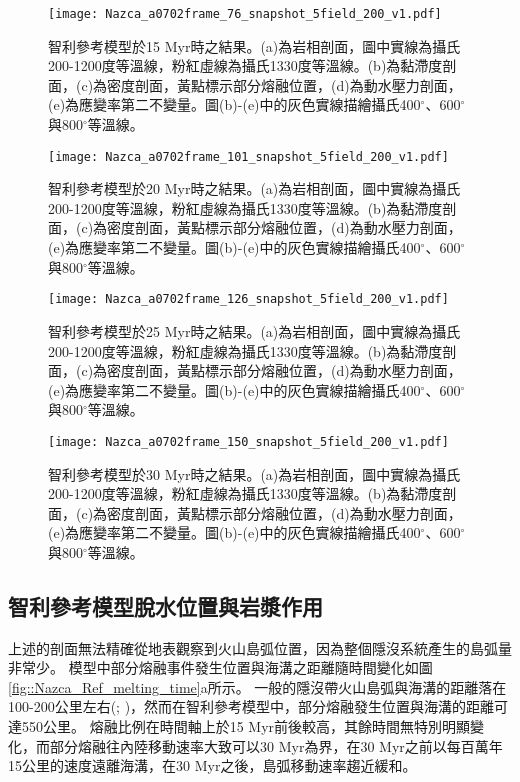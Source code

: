 \begin{figure*}[htp]
    \centering
    \texttt{[image: Nazca\_a0702frame\_76\_snapshot\_5field\_200\_v1.pdf]}
    \caption[智利參考模型於15 Myr時之結果]{智利參考模型於15 Myr時之結果。(a)為岩相剖面，圖中實線為攝氏200-1200度等溫線，粉紅虛線為攝氏1330度等溫線。(b)為黏滯度剖面，(c)為密度剖面，黃點標示部分熔融位置，(d)為動水壓力剖面，(e)為應變率第二不變量。圖(b)-(e)中的灰色實線描繪攝氏400$^{\circ}$、600$^{\circ}$與800$^{\circ}$等溫線。}
    \label{fig::Nazca_Ref_76}
\end{figure*}

\begin{figure*}[htp]
    \centering
    \texttt{[image: Nazca\_a0702frame\_101\_snapshot\_5field\_200\_v1.pdf]}
    \caption[智利參考模型於20 Myr時之結果]{智利參考模型於20 Myr時之結果。(a)為岩相剖面，圖中實線為攝氏200-1200度等溫線，粉紅虛線為攝氏1330度等溫線。(b)為黏滯度剖面，(c)為密度剖面，黃點標示部分熔融位置，(d)為動水壓力剖面，(e)為應變率第二不變量。圖(b)-(e)中的灰色實線描繪攝氏400$^{\circ}$、600$^{\circ}$與800$^{\circ}$等溫線。}
    \label{fig::Nazca_Ref_101}
\end{figure*}

\begin{figure*}[htp]
    \centering
    \texttt{[image: Nazca\_a0702frame\_126\_snapshot\_5field\_200\_v1.pdf]}
    \caption[智利參考模型於25 Myr時之結果]{智利參考模型於25 Myr時之結果。(a)為岩相剖面，圖中實線為攝氏200-1200度等溫線，粉紅虛線為攝氏1330度等溫線。(b)為黏滯度剖面，(c)為密度剖面，黃點標示部分熔融位置，(d)為動水壓力剖面，(e)為應變率第二不變量。圖(b)-(e)中的灰色實線描繪攝氏400$^{\circ}$、600$^{\circ}$與800$^{\circ}$等溫線。}
    \label{fig::Nazca_Ref_126}
\end{figure*}


\begin{figure*}[htp]
    \centering
    \texttt{[image: Nazca\_a0702frame\_150\_snapshot\_5field\_200\_v1.pdf]}
    \caption[智利參考模型於30 Myr時之結果]{智利參考模型於30 Myr時之結果。(a)為岩相剖面，圖中實線為攝氏200-1200度等溫線，粉紅虛線為攝氏1330度等溫線。(b)為黏滯度剖面，(c)為密度剖面，黃點標示部分熔融位置，(d)為動水壓力剖面，(e)為應變率第二不變量。圖(b)-(e)中的灰色實線描繪攝氏400$^{\circ}$、600$^{\circ}$與800$^{\circ}$等溫線。}
    \label{fig::Nazca_Ref_150}
\end{figure*}
\newpage
\subsection{智利參考模型脫水位置與岩漿作用}
上述的剖面無法精確從地表觀察到火山島弧位置，因為整個隱沒系統產生的島弧量非常少。
模型中部分熔融事件發生位置與海溝之距離隨時間變化如圖\ref{fig::Nazca_Ref_melting_time}a所示。
一般的隱沒帶火山島弧與海溝的距離落在100-200公里左右(\citealp{peacock1990fluid}; \citealp{hyndman2003serpentinization})，然而在智利參考模型中，部分熔融發生位置與海溝的距離可達550公里。
熔融比例在時間軸上於15 Myr前後較高，其餘時間無特別明顯變化，而部分熔融往內陸移動速率大致可以30 Myr為界，在30 Myr之前以每百萬年15公里的速度遠離海溝，在30 Myr之後，島弧移動速率趨近緩和。

